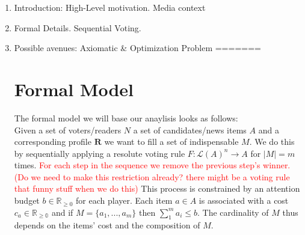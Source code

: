 \documentclass[10pt,a4paper]{article}
\begin{document}
\begin{enumerate}
\item Introduction: High-Level motivation. Media context
\item Formal Details. Sequential Voting.
\item Possible avenues: Axiomatic \& Optimization Problem
=======
\section{Formal Model}
The formal model we will base our anaylisis looks as follows:\\
Given a set of voters/readers $N$ a set of candidates/news items $A$ and a corresponding profile $\mathbf{R}$ we want to fill a set of indispensable $M$. We do this by sequentially applying a resolute voting rule $F:\mathcal{L}(A)^n \rightarrow A$ for $|M|=m$ times. \textcolor{red}{For each step in the sequence we remove the previous step's winner. (Do we need to make this restriction already? there might be a voting rule that funny stuff when we do this)} This process is constrained by an attention budget $b\in \mathbb{R}_{\geq 0}$ for each player. Each item $a\in A$ is associated with a cost $c_a\in \mathbb{R_{\geq 0}}$ and if $M=\{a_1,...,a_m\}$ then $\sum_1^m a_i \leq b$. The cardinality of $M$ thus depends on the items' cost and the composition of $M$.


\end{enumerate}
\end{document}
